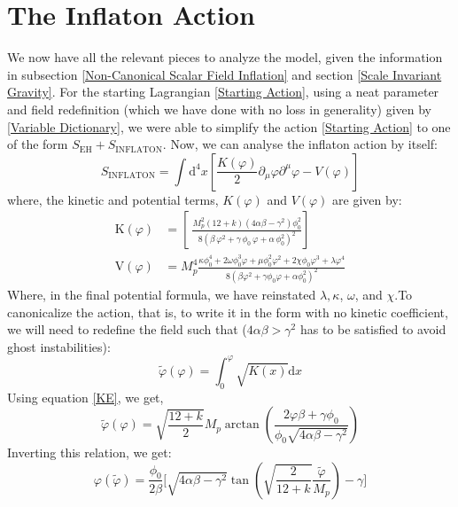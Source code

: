 \documentclass[aps,prd,reprint,preprintnumbers,showpacs,floatfix,nofootinbib,superscript address]{revtex4-2}
\begin{document}
\section{The Inflaton Action} \label{Solution}
We now have all the relevant pieces to analyze the model, given the information in subsection \ref{Non-Canonical Scalar Field Inflation}  and section \ref{Scale Invariant Gravity}. For the starting Lagrangian \ref{Starting Action}, using a neat parameter and field redefinition (which we have done with no loss in generality) given by \ref{Variable Dictionary}, we were able to simplify the action \ref{Starting Action} to one of the form $S_{\text{EH}} + S_{\text{INFLATON}}$. Now, we can analyse the inflaton action by itself: 
\begin{equation}
    S_{\text{INFLATON}} = \int \text{d}^4x \left[ \frac{K(\varphi)}{2} \partial_\mu \varphi \partial^\mu \varphi - V(\varphi)\right]
\end{equation}
where, the kinetic and potential terms, $K(\varphi)$ and $V(\varphi)$ are given by:
\begin{align}
    \text{K}(\varphi) &= \left[\ \frac{M_p^2(12+k)(4\alpha\beta-\gamma^2) \phi_0^2}{8(\beta\,\varphi^2 + \gamma\,\phi_0\,\varphi + \alpha\,\phi_0^2)^2} \right] \label{KE} \\
    \text{V}(\varphi) &= M_p^4  \frac{ \kappa \phi_0^4 + 2\omega \phi_0^3 \varphi +\mu \phi^2_0 \varphi^2 + 2\chi \phi_0 \varphi^3 + \lambda \varphi^4 }{8(\beta \varphi^2 + \gamma\phi_0\varphi + \alpha \phi_0^2)^2} \label{VE}
\end{align}
Where, in the final potential formula, we have reinstated $\lambda, \kappa$, $\omega$, and $\chi$.To canonicalize the action, that is, to write it in the form with no kinetic coefficient, we will need to redefine the field such that ($4\alpha \beta > \gamma^2$ has to be satisfied to avoid ghost instabilities):
\begin{equation} \label{40}
    \tilde{\varphi}(\varphi) = \int_0^{\varphi} \sqrt{K(x)} \text{d}x
\end{equation}
Using equation \ref{KE}, we get,
\begin{equation}
    \tilde{\varphi}(\varphi) = \sqrt{\frac{12+k}{2}}M_p \arctan \left( \frac{2\varphi\beta + \gamma \phi_0}{\phi_0\sqrt{4\alpha\beta - \gamma^2}} \right)
\end{equation}
Inverting this relation, we get:
\begin{equation}
    \varphi(\tilde{\varphi}) = \frac{\phi_0}{2\beta} \Biggl[ \sqrt{4\alpha\beta - \gamma^2} \tan\left(\sqrt{\frac{2}{12+k}}\frac{\tilde{\varphi}}{M_p}\right) - \gamma \Biggr] 
\end{equation}
\end{document}
